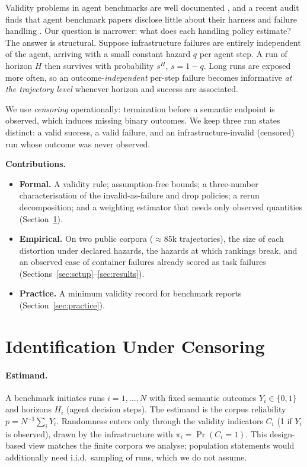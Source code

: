 \documentclass[letterpaper]{article} %
\begin{document}
Validity problems in agent benchmarks are well documented
\citep{kapoor2024agentsthatmatter,weidinger2025evalscience,zhu2026guardrails},
and a recent audit finds that agent benchmark papers disclose little about their
harness and failure handling \citep{moghadasi2026disclose}. Our question is
narrower: what does each handling policy estimate? The answer is structural.
Suppose infrastructure failures are entirely independent of the agent, arriving
with a small constant hazard $q$ per agent step. A run of horizon $H$ then
survives with probability $s^{H}$, $s=1-q$. Long runs are exposed more often,
so an outcome-\emph{independent} per-step failure becomes informative \emph{at
the trajectory level} whenever horizon and success are associated.

We use \emph{censoring} operationally: termination before a semantic endpoint is
observed, which induces missing binary outcomes. We keep three run states
distinct: a valid success, a valid failure, and an infrastructure-invalid
(censored) run whose outcome was never observed.

\vspace{2pt}
\noindent\textbf{Contributions.}
\begin{itemize}\itemsep1pt \parskip0pt 
\item \textbf{Formal.} A validity rule; assumption-free bounds; a three-number
characterisation of the invalid-as-failure and drop policies; a rerun
decomposition; and a weighting estimator that needs only observed quantities
(Section~\ref{sec:model}).
\item \textbf{Empirical.} On two public corpora ($\approx$85k trajectories), the
size of each distortion under declared hazards, the hazards at which rankings
break, and an observed case of container failures already scored as task
failures (Sections~\ref{sec:setup}--\ref{sec:results}).
\item \textbf{Practice.} A minimum validity record for benchmark reports
(Section~\ref{sec:practice}).
\end{itemize}

\section{Identification Under Censoring}
\label{sec:model}

\paragraph{Estimand.} A benchmark initiates runs $i=1,\dots,N$ with fixed
semantic outcomes $Y_i\in\{0,1\}$ and horizons $H_i$ (agent decision steps). The
estimand is the corpus reliability $p=N^{-1}\sum_i Y_i$. Randomness enters only
through the validity indicators $C_i$ (1 if $Y_i$ is observed), drawn by the
infrastructure with $\pi_i=\Pr(C_i=1)$. This design-based view matches the
finite corpora we analyse; population statements would additionally need
i.i.d.\ sampling of runs, which we do not assume.
\end{document}
